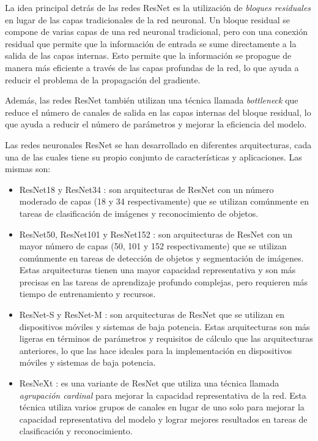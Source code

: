 La idea principal detrás de las redes ResNet es la utilización de {\it bloques residuales} en lugar de las capas
tradicionales de la red neuronal. Un bloque residual se compone de varias capas de una red neuronal tradicional, pero
con una conexión residual que permite que la información de entrada se sume directamente a la salida de las capas
internas. Esto permite que la información se propague de manera más eficiente a través de las capas profundas de la
red, lo que ayuda a reducir el problema de la propagación del gradiente.

Además, las redes ResNet también utilizan una técnica llamada {\it bottleneck} que reduce el número de canales de
salida en las capas internas del bloque residual, lo que ayuda a reducir el número de parámetros y mejorar la
eficiencia del modelo.

Las redes neuronales ResNet se han desarrollado en diferentes arquitecturas, cada una de las cuales tiene su propio
conjunto de características y aplicaciones. Las mismas son:

\begin{itemize}
    \item ResNet18 y ResNet34 \parencite{he2016deep}: son arquitecturas de ResNet con un número moderado de capas (18 y 34 respectivamente) que se
          utilizan comúnmente en tareas de clasificación de imágenes y reconocimiento de objetos.
    \item ResNet50, ResNet101 y ResNet152 \parencite{he2016deep}: son arquitecturas de ResNet con un mayor número de capas (50, 101 y 152 respectivamente) que se
          utilizan comúnmente en tareas de detección de objetos y segmentación de imágenes. Estas arquitecturas tienen una mayor
          capacidad representativa y son más precisas en las tareas de aprendizaje profundo complejas, pero requieren más tiempo
          de entrenamiento y recursos.
    \item ResNet-S y ResNet-M \parencite{sandler2018mobilenetv2}: son arquitecturas de ResNet que se utilizan en dispositivos móviles y sistemas de baja
          potencia. Estas arquitecturas son más ligeras en términos de parámetros y requisitos de cálculo que las arquitecturas
          anteriores, lo que las hace ideales para la implementación en dispositivos móviles y sistemas de baja potencia.
    \item ResNeXt \parencite{xie2017aggregated}: es una variante de ResNet que utiliza una técnica llamada {\it agrupación cardinal} para
          mejorar la capacidad representativa de la red. Esta técnica utiliza varios grupos de canales en lugar de uno solo para
          mejorar la capacidad representativa del modelo y lograr mejores resultados en tareas de clasificación y reconocimiento.
\end{itemize}

